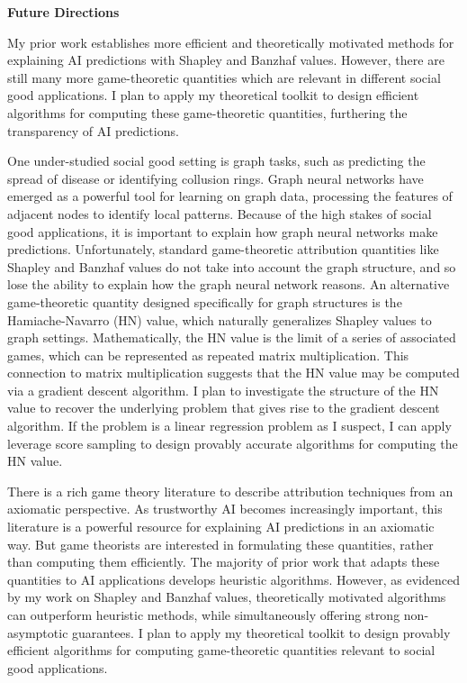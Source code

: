 \documentclass[11pt]{article}
\begin{document}
{{ \large \textbf{Future Directions}}

My prior work establishes more efficient and theoretically motivated methods for explaining AI predictions with Shapley and Banzhaf values.
However, there are still many more game-theoretic quantities which are relevant in different social good applications.
I plan to apply my theoretical toolkit to design efficient algorithms for computing these game-theoretic quantities, furthering the transparency of AI predictions.

One under-studied social good setting is graph tasks, such as predicting the spread of disease or identifying collusion rings.
Graph neural networks have emerged as a powerful tool for learning on graph data, processing the features of adjacent nodes to identify local patterns.
Because of the high stakes of social good applications, it is important to explain how graph neural networks make predictions.
Unfortunately, standard game-theoretic attribution quantities like Shapley and Banzhaf values do not take into account the graph structure, and so lose the ability to explain how the graph neural network reasons.
An alternative game-theoretic quantity designed specifically for graph structures is the Hamiache-Navarro (HN) value, which naturally generalizes Shapley values to graph settings.
Mathematically, the HN value is the limit of a series of associated games, which can be represented as repeated matrix multiplication.
This connection to matrix multiplication suggests that the HN value may be computed via a gradient descent algorithm.
I plan to investigate the structure of the HN value to recover the underlying problem that gives rise to the gradient descent algorithm.
If the problem is a linear regression problem as I suspect, I can apply leverage score sampling to design provably accurate algorithms for computing the HN value.

There is a rich game theory literature to describe attribution techniques from an axiomatic perspective.
As trustworthy AI becomes increasingly important, this literature is a powerful resource for explaining AI predictions in an axiomatic way.
But game theorists are interested in formulating these quantities, rather than computing them efficiently.
The majority of prior work that adapts these quantities to AI applications develops heuristic algorithms.
However, as evidenced by my work on Shapley and Banzhaf values, theoretically motivated algorithms can outperform heuristic methods, while simultaneously offering strong non-asymptotic guarantees.
I plan to apply my theoretical toolkit to design provably efficient algorithms for computing game-theoretic quantities relevant to social good applications. 

}
\end{document}
